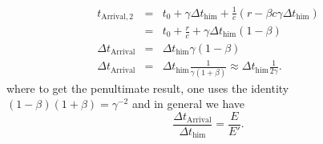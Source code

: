 \documentclass[pdftex,10pt]{article}
\begin{document}
\begin{enumerate}
\begin{enumerate}
\begin{eqnarray}
t_\mathrm{Arrival,2} &=& t_0 + \gamma \Delta t_\mathrm{him} +
\frac{1}{c} \left ( r - \beta c \gamma \Delta t_\mathrm{him}
\right )  \\
 &=& t_0 + \frac{r}{c} + \gamma \Delta t_\mathrm{him} \left ( 1 -
   \beta \right ) \\
\Delta t_\mathrm{Arrival} &=& \Delta t_\mathrm{him} \gamma \left (1 - \beta
\right ) \\
\Delta t_\mathrm{Arrival} &=& \Delta t_\mathrm{him} \frac{1}{\gamma \left (1 + \beta
\right )} \approx \Delta t_\mathrm{him} \frac{1}{2\gamma}.
\end{eqnarray} 
where to get the penultimate result, one uses the identity
$(1-\beta)(1+\beta) = \gamma^{-2}$ and in general we have
\begin{equation}
\frac{\Delta t_\mathrm{Arrival}}{\Delta t_\mathrm{him}} = \frac{E}{E'}.
\end{equation}
\end{enumerate}
\end{enumerate}
\ifx\bookloaded\undefined
\end{document}
